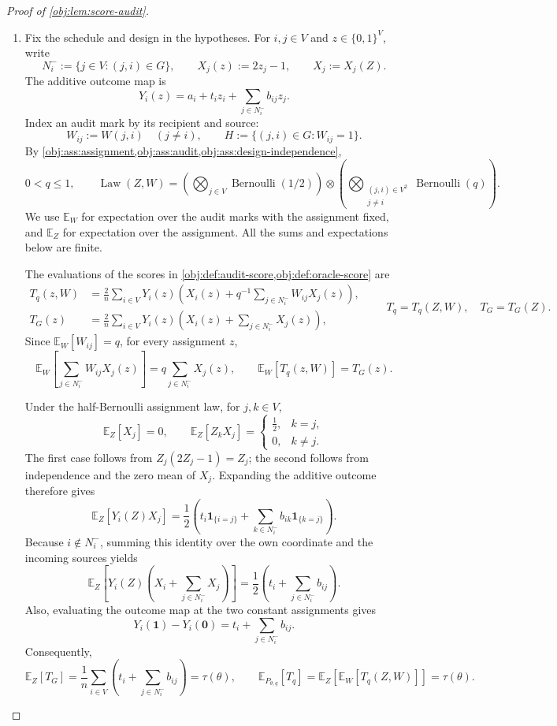 \documentclass[11pt]{article}
\begin{document}
\begin{proof}[Proof of \cref{obj:lem:score-audit}]
\begin{enumerate}
\item Fix the schedule and design in the hypotheses. For \(i,j\in V\) and \(z\in\{0,1\}^{V}\), write
\[
N_i^-:=\{j\in V:(j,i)\in G\},
\qquad
X_j(z):=2z_j-1,
\qquad
X_j:=X_j(Z).
\]
The additive outcome map is
\[
Y_i(z)=a_i+t_i z_i+\sum_{j\in N_i^-}b_{ij}z_j.
\]
Index an audit mark by its recipient and source:
\[
W_{ij}:=W(j,i)\quad(j\ne i),
\qquad
H:=\{(j,i)\in G:W_{ij}=1\}.
\]
By \cref{obj:ass:assignment,obj:ass:audit,obj:ass:design-independence},
\[
0<q\le1,
\qquad
\operatorname{Law}(Z,W)
=
\left(\bigotimes_{j\in V}\operatorname{Bernoulli}(1/2)\right)
\otimes
\left(\bigotimes_{\substack{(j,i)\in V^2\\j\ne i}}
\operatorname{Bernoulli}(q)\right).
\]
We use \(\mathbb E_W\) for expectation over the audit marks with the assignment fixed, and \(\mathbb E_Z\) for expectation over the assignment. All the sums and expectations below are finite.

The evaluations of the scores in
\cref{obj:def:audit-score,obj:def:oracle-score} are
\[
\begin{aligned}
T_q(z,W)
&=\frac2n\sum_{i\in V}Y_i(z)
 \left(X_i(z)+q^{-1}\sum_{j\in N_i^-}W_{ij}X_j(z)\right),\\
T_G(z)
&=\frac2n\sum_{i\in V}Y_i(z)
 \left(X_i(z)+\sum_{j\in N_i^-}X_j(z)\right),
\end{aligned}
\qquad
T_q=T_q(Z,W),\quad T_G=T_G(Z).
\]
Since \(\mathbb E_W[W_{ij}]=q\), for every assignment \(z\),
\[
\mathbb E_W\!\left[\sum_{j\in N_i^-}W_{ij}X_j(z)\right]
=q\sum_{j\in N_i^-}X_j(z),
\qquad
\mathbb E_W[T_q(z,W)]=T_G(z).
\]

Under the half-Bernoulli assignment law, for \(j,k\in V\),
\[
\mathbb E_Z[X_j]=0,
\qquad
\mathbb E_Z[Z_kX_j]
=
\begin{cases}
\frac12,&k=j,\\
0,&k\ne j.
\end{cases}
\]
The first case follows from \(Z_j(2Z_j-1)=Z_j\); the second follows from independence and the zero mean of \(X_j\). Expanding the additive outcome therefore gives
\[
\mathbb E_Z[Y_i(Z)X_j]
=
\frac12\left(
t_i\mathbf1_{\{i=j\}}
+\sum_{k\in N_i^-}b_{ik}\mathbf1_{\{k=j\}}
\right).
\]
Because \(i\notin N_i^-\), summing this identity over the own coordinate and the incoming sources yields
\[
\mathbb E_Z\!\left[
Y_i(Z)\left(X_i+\sum_{j\in N_i^-}X_j\right)
\right]
=
\frac12\left(t_i+\sum_{j\in N_i^-}b_{ij}\right).
\]
Also, evaluating the outcome map at the two constant assignments gives
\[
Y_i(\mathbf1)-Y_i(\mathbf0)
=t_i+\sum_{j\in N_i^-}b_{ij}.
\]
Consequently,
\[
\mathbb E_Z[T_G]
=\frac1n\sum_{i\in V}\left(t_i+\sum_{j\in N_i^-}b_{ij}\right)
=\tau(\theta),
\qquad
\mathbb E_{P_{\theta,q}}[T_q]
=\mathbb E_Z\!\left[\mathbb E_W[T_q(Z,W)]\right]
=\tau(\theta).
\]


\end{enumerate}
\end{proof}
\end{document}

